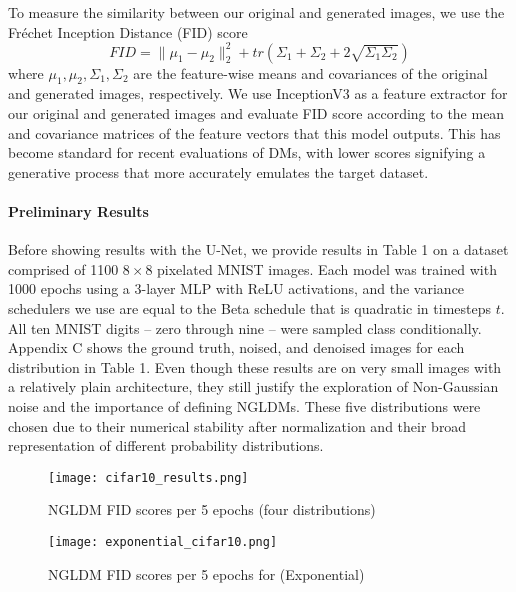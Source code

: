 \documentclass[10pt,twocolumn,letterpaper]{article}
\newcommand\norm[1]{\lVert#1\rVert}
\begin{document}
To measure the similarity between our original and generated images, we use the Fréchet Inception Distance (FID) score \cite{DBLP:journals/corr/HeuselRUNKH17}
\begin{equation}
    FID=\norm{\mu_1-\mu_2}^2_2+tr(\Sigma_1+\Sigma_2+2\sqrt{\Sigma_1 \Sigma_2})
\end{equation}
where $\mu_1,\mu_2,\Sigma_1,\Sigma_2$ are the feature-wise means and covariances of the original and generated images, respectively. We use InceptionV3 \cite{DBLP:journals/corr/SzegedyVISW15} as a feature extractor for our original and generated images and evaluate FID score according to the mean and covariance matrices of the feature vectors that this model outputs. This has become standard for recent evaluations of DMs, with lower scores signifying a generative process that more accurately emulates the target dataset.

\paragraph{\textbf{Preliminary Results}} Before showing results with the U-Net, we provide results in Table 1 on a dataset comprised of 1100 $8\times 8$ pixelated MNIST images. Each model was trained with 1000 epochs using a 3-layer MLP with ReLU activations, and the variance schedulers we use are equal to the Beta schedule that is quadratic in timesteps $t$. All ten MNIST digits -- zero through nine -- were sampled class conditionally. Appendix C shows the ground truth, noised, and denoised images for each distribution in Table 1. Even though these results are on very small images with a relatively plain architecture, they still justify the exploration of Non-Gaussian noise and the importance of defining NGLDMs. These five distributions were chosen due to their numerical stability after normalization and their broad representation of different probability distributions.

\begin{figure}[t]
  \centering
   \texttt{[image: cifar10\_results.png]}
   \caption{NGLDM FID scores per 5 epochs (four distributions)}
   \label{fig:onecol}
\end{figure}

\begin{figure}[t]
  \centering
   \texttt{[image: exponential\_cifar10.png]}
   \caption{NGLDM FID scores per 5 epochs for (Exponential)}
   \label{fig:onecol}
\end{figure}
\end{document}
